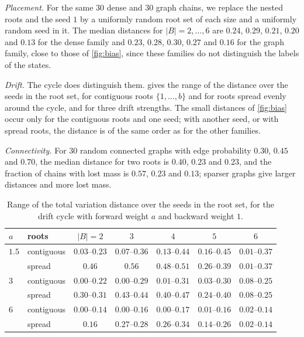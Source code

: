 \documentclass[onefignum,onetabnum]{siamart250211}
\numberwithin{theorem}{section}
\numberwithin{equation}{section}
\begin{document}
\emph{Placement.} For the same $30$ dense and $30$ graph chains, we
replace the nested roots and the seed $1$ by a uniformly random root set
of each size and a uniformly random seed in it. The median distances for
$|B|=2,\dots,6$ are $0.24$, $0.29$, $0.21$, $0.20$ and $0.13$ for the
dense family and $0.23$, $0.28$, $0.30$, $0.27$ and $0.16$ for the graph
family, close to those of \cref{fig:bias}, since these families do not
distinguish the labels of the states.

\emph{Drift.} The cycle does
distinguish them.  gives the range of the distance over
the seeds in the root set, for contiguous roots $\{1,\dots,b\}$ and for
roots spread evenly around the cycle, and for three drift strengths.
The small distances of \cref{fig:bias} occur only for the contiguous
roots and one seed; with another seed, or with spread roots, the
distance is of the same order as for the other families.

\emph{Connectivity.} For $30$ random connected graphs with edge
probability $0.30$, $0.45$ and $0.70$, the median distance for two roots
is $0.40$, $0.23$ and $0.23$, and the fraction of chains with lost mass
is $0.57$, $0.23$ and $0.13$; sparser graphs give larger distances and
more lost mass.

\begin{table}[!htbp]
\caption{Range of the total variation distance over the seeds in the
root set, for the drift cycle with forward weight $a$ and backward
weight $1$.}\label{tab:drift}
\centering
\footnotesize
\begin{tabular}{@{}llccccc@{}}
\toprule
$a$ & roots & $|B|=2$ & $3$ & $4$ & $5$ & $6$\\
\midrule
$1.5$ & contiguous & $0.03$--$0.23$ & $0.07$--$0.36$ & $0.13$--$0.44$ & $0.16$--$0.45$ & $0.01$--$0.37$\\
 & spread & $0.46$ & $0.56$ & $0.48$--$0.51$ & $0.26$--$0.39$ & $0.01$--$0.37$\\
\addlinespace[2pt]
$3$ & contiguous & $0.00$--$0.22$ & $0.00$--$0.29$ & $0.01$--$0.31$ & $0.03$--$0.30$ & $0.08$--$0.25$\\
 & spread & $0.30$--$0.31$ & $0.43$--$0.44$ & $0.40$--$0.47$ & $0.24$--$0.40$ & $0.08$--$0.25$\\
\addlinespace[2pt]
$6$ & contiguous & $0.00$--$0.14$ & $0.00$--$0.16$ & $0.00$--$0.17$ & $0.01$--$0.16$ & $0.02$--$0.14$\\
 & spread & $0.16$ & $0.27$--$0.28$ & $0.26$--$0.34$ & $0.14$--$0.26$ & $0.02$--$0.14$\\
\bottomrule
\end{tabular}
\end{table}
\end{document}
